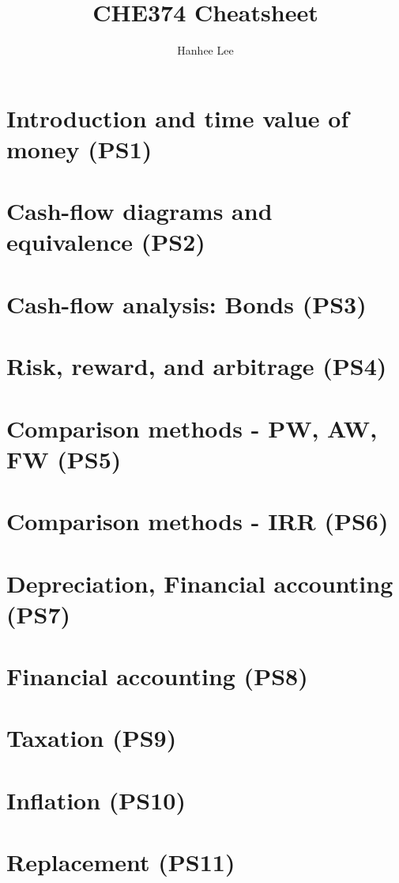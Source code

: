 \documentclass{article}
\title{CHE374 Cheatsheet}
\author{Hanhee Lee}
\begin{document}
\maketitle

\tableofcontents

\listoffigures

\listoftables

\section{Introduction and time value of money (PS1)}

\newpage

\section{Cash-flow diagrams and equivalence (PS2)}

\newpage

\section{Cash-flow analysis: Bonds (PS3)}

\newpage

\section{Risk, reward, and arbitrage (PS4)} %

\newpage

\section{Comparison methods - PW, AW, FW (PS5)}

\newpage

\section{Comparison methods - IRR (PS6)}

\newpage

\section{Depreciation, Financial accounting (PS7)}

\newpage

\section{Financial accounting (PS8)}

\newpage

\section{Taxation (PS9)}

\newpage

\section{Inflation (PS10)}

\newpage

\section{Replacement (PS11)}

\end{document}
